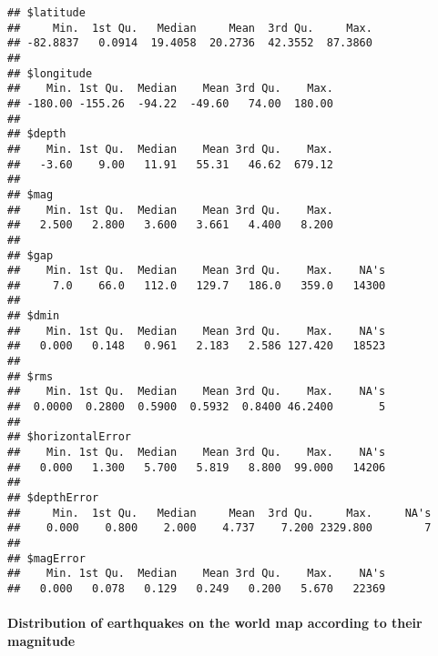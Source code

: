 \documentclass[
]{article}
\begin{document}
\begin{verbatim}
## $latitude
##     Min.  1st Qu.   Median     Mean  3rd Qu.     Max. 
## -82.8837   0.0914  19.4058  20.2736  42.3552  87.3860 
## 
## $longitude
##    Min. 1st Qu.  Median    Mean 3rd Qu.    Max. 
## -180.00 -155.26  -94.22  -49.60   74.00  180.00 
## 
## $depth
##    Min. 1st Qu.  Median    Mean 3rd Qu.    Max. 
##   -3.60    9.00   11.91   55.31   46.62  679.12 
## 
## $mag
##    Min. 1st Qu.  Median    Mean 3rd Qu.    Max. 
##   2.500   2.800   3.600   3.661   4.400   8.200 
## 
## $gap
##    Min. 1st Qu.  Median    Mean 3rd Qu.    Max.    NA's 
##     7.0    66.0   112.0   129.7   186.0   359.0   14300 
## 
## $dmin
##    Min. 1st Qu.  Median    Mean 3rd Qu.    Max.    NA's 
##   0.000   0.148   0.961   2.183   2.586 127.420   18523 
## 
## $rms
##    Min. 1st Qu.  Median    Mean 3rd Qu.    Max.    NA's 
##  0.0000  0.2800  0.5900  0.5932  0.8400 46.2400       5 
## 
## $horizontalError
##    Min. 1st Qu.  Median    Mean 3rd Qu.    Max.    NA's 
##   0.000   1.300   5.700   5.819   8.800  99.000   14206 
## 
## $depthError
##     Min.  1st Qu.   Median     Mean  3rd Qu.     Max.     NA's 
##    0.000    0.800    2.000    4.737    7.200 2329.800        7 
## 
## $magError
##    Min. 1st Qu.  Median    Mean 3rd Qu.    Max.    NA's 
##   0.000   0.078   0.129   0.249   0.200   5.670   22369
\end{verbatim}

\hypertarget{distribution-of-earthquakes-on-the-world-map-according-to-their-magnitude}{%
\paragraph{Distribution of earthquakes on the world map according to
their
magnitude}\label{distribution-of-earthquakes-on-the-world-map-according-to-their-magnitude}}
\end{document}
